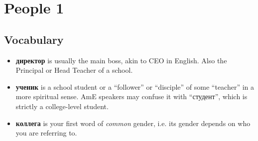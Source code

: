\chapter{People 1}\label{people-1}

\section{Vocabulary}\label{vocabulary}

\begin{itemize}
\tightlist
\item
  \textbf{директор} is usually the main boss, akin to CEO in English.
  Also the Principal or Head Teacher of a school.
\item
  \textbf{ученик} is a school student or a ``follower'' or ``disciple''
  of some ``teacher'' in a more spiritual sense. AmE speakers may
  confuse it with ``студент'', which is strictly a college-level
  student.
\item
  \textbf{коллега} is your first word of \emph{common} gender, i.e. its
  gender depends on who you are referring to.
\end{itemize}
